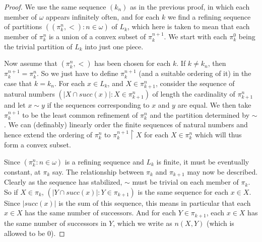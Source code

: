 \documentclass[10pt,a4paper]{amsart}
\begin{document}
\begin{proof} We use the same sequence $(k_n)$ as in the previous proof, in which each member of $\omega$ 
appears infinitely often, and for each $k$ we find a refining sequence of partitions 
$((\pi_k^n, <): n \in \omega)$ of $L_k$, which here is taken to mean that each member of $\pi_k^n$ is a 
union of a convex subset of $\pi_k^{n+1}$. We start with each $\pi_k^0$ 
being the trivial partition of $L_k$ into just one piece.

Now assume that $(\pi_k^n, <)$ has been chosen for each $k$. If $k \neq k_n$, then $\pi_k^{n+1} = \pi_k^n$.
So we just have to define $\pi_k^{n+1}$ (and a suitable ordering of it) in the case that $k = k_n$. For each
$x \in L_k$, and $X \in \pi^n_{k+1}$, consider the sequence of natural numbers $(|X \cap succ(x)|: X \in \pi^n_{k+1})$
of length the cardinality of $\pi^n_{k+1}$ and let $x \sim y$ if the sequences corresponding to $x$ and $y$ are equal.
We then take $\pi^{n+1}_k$ to be the least common refinement of $\pi^n_k$ and the partition determined by $\sim$. We
can (definably) linearly order the finite sequences of natural numbers and hence extend the ordering of $\pi^n_k$ to
$\pi^{n+1}_k \upharpoonright X$ for each $X \in \pi^n_k$ which will thus form a convex subset.

Since $(\pi^n_k: n \in \omega)$ is a refining sequence and $L_k$ is finite, it must be eventually constant, at $\pi_k$ 
say. The relationship between $\pi_k$ and $\pi_{k+1}$ may now be described. Clearly as the sequence has stabilized,
$\sim$ must be trivial on each member of $\pi_k$. So if $X \in \pi_k$, $(|Y \cap succ(x)|: Y \in \pi_{k+1})$ is the same
sequence for each $x \in X$. Since $|succ(x)|$ is the sum of this sequence, this means in particular that each $x \in X$ 
has the same number of successors. And for each $Y \in \pi_{k+1}$, each $x \in X$ has the same number of successors in $Y$,
which we write as $n(X,Y)$ (which is allowed to be 0).     \end{proof} 
\end{document}
